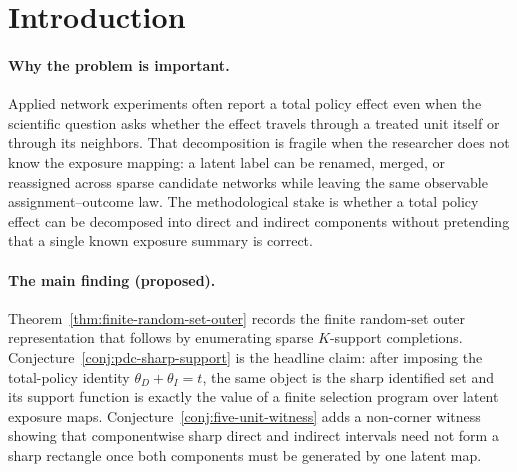 \documentclass[11pt]{article}
\theoremstyle{definition}
\theoremstyle{plain}
\theoremstyle{remark}
\begin{document}
\begin{abstract}
Network-interference papers now distinguish direct, indirect, total, and
policy effects, but existing decompositions assume either a known exposure
mapping or a fixed misspecification class.  This proposal asks for the sharp
partial-identification region for the direct--indirect pair when the exposure
labels themselves are latent finite-support objects and only the total policy
contrast is fixed.  The flagship kernel is the conjecture that the
\emph{policy-decomposition compatibility set} \(\mathcal R_K(P;t)\) has a
random-set support-function representation over sparse \(K\)-valued exposure
maps, and that this representation is sharp rather than merely an outer bound.
The proposal also conjectures a concrete five-unit witness in which the
componentwise direct and indirect intervals both contain the truth but no
single latent exposure map attains their endpoint pair.  If resolved, the
result would turn the Hu--Li--Wager total-effect decomposition into a robust
partial-identification object for network experiments with unknown exposure
support.
\end{abstract}

\section{Introduction}
\paragraph{Why the problem is important.}
Applied network experiments often report a total policy effect even when the
scientific question asks whether the effect travels through a treated unit
itself or through its neighbors.  That decomposition is fragile when the
researcher does not know the exposure mapping: a latent label can be renamed,
merged, or reassigned across sparse candidate networks while leaving the same
observable assignment--outcome law.  The methodological stake is whether a
total policy effect can be decomposed into direct and indirect components
without pretending that a single known exposure summary is correct.

\paragraph{The main finding (proposed).}
Theorem~\ref{thm:finite-random-set-outer} records the finite random-set outer
representation that follows by enumerating sparse \(K\)-support completions.
Conjecture~\ref{conj:pdc-sharp-support} is the headline claim: after imposing
the total-policy identity \(\theta_D+\theta_I=t\), the same object is the sharp
identified set and its support function is exactly the value of a finite
selection program over latent exposure maps.  Conjecture~\ref{conj:five-unit-witness}
adds a non-corner witness showing that componentwise sharp direct and indirect
intervals need not form a sharp rectangle once both components must be
generated by one latent map.
\end{document}
